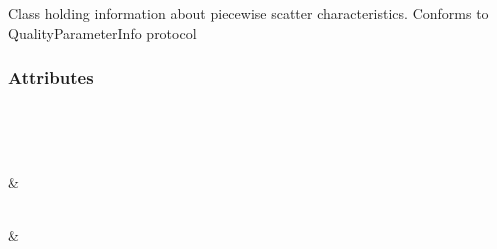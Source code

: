 \documentclass[letterpaper,10pt,english]{sphinxmanual}
\begin{document}
\begin{fulllineitems}
\label{\detokenize{generated/quality_assessment.data_types.ScatterInfo:quality_assessment.data_types.ScatterInfo}}
\sphinxAtStartPar
Class holding information about piecewise scatter characteristics.
Conforms to QualityParameterInfo protocol
\subsubsection*{Attributes}


\begin{savenotes}\sphinxatlongtablestart\begin{longtable}[c]{}
\hline

\endfirsthead

%
{}\\
\hline

\endhead

\hline
{}\\
\endfoot

\endlastfoot

\sphinxAtStartPar
{\hyperref[\detokenize{generated/quality_assessment.data_types.ScatterInfo.center_position:quality_assessment.data_types.ScatterInfo.center_position}]{}}
&
\sphinxAtStartPar

\\
\hline
\sphinxAtStartPar
{\hyperref[\detokenize{generated/quality_assessment.data_types.ScatterInfo.description:quality_assessment.data_types.ScatterInfo.description}]{}}
&
\sphinxAtStartPar


\end{longtable}
\end{savenotes}
\end{fulllineitems}
\end{document}
